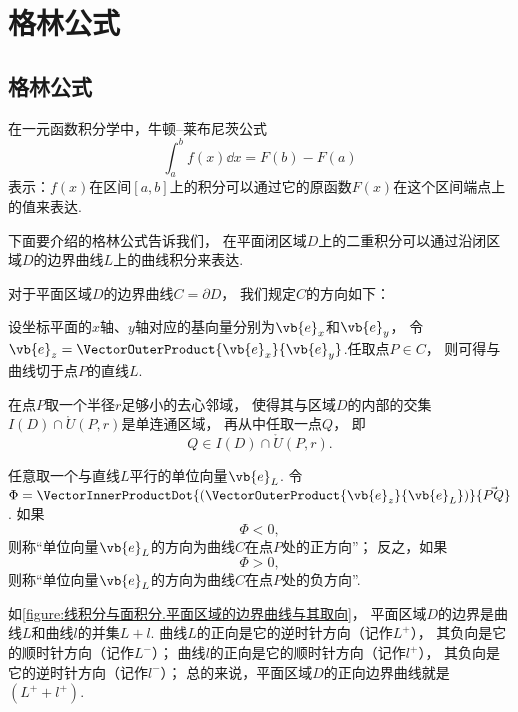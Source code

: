 \section{格林公式}
\subsection{格林公式}
在一元函数积分学中，牛顿--莱布尼茨公式\begin{equation*}
	\int_a^b f(x) \dd{x} = F(b) - F(a)
\end{equation*}表示：\(f(x)\)在区间\([a,b]\)上的积分可以通过它的原函数\(F(x)\)在这个区间端点上的值来表达.

下面要介绍的格林公式告诉我们，
在平面闭区域\(D\)上的二重积分可以通过沿闭区域\(D\)的边界曲线\(L\)上的曲线积分来表达.

\begin{definition}\label{definition:线积分与面积分.平面闭区域的边界曲线的取向}
对于平面区域\(D\)的边界曲线\(C = \partial D\)，
我们规定\(C\)的方向如下：

设坐标平面的\(x\)轴、\(y\)轴对应的基向量分别为\(\vb{e}_x\)和\(\vb{e}_y\)，
令\(\vb{e}_z = \VectorOuterProduct{\vb{e}_x}{\vb{e}_y}\).任取点\(P \in C\)，
则可得与曲线切于点\(P\)的直线\(L\).

在点\(P\)取一个半径\(r\)足够小的去心邻域，
使得其与区域\(D\)的内部的交集\(I(D) \cap \mathring{U}(P,r)\)是单连通区域，
再从中任取一点\(Q\)，
即\begin{equation*}
	Q \in I(D) \cap \mathring{U}(P,r).
\end{equation*}

任意取一个与直线\(L\)平行的单位向量\(\vb{e}_L\).
令\(\Phi = \VectorInnerProductDot{(\VectorOuterProduct{\vb{e}_z}{\vb{e}_L})}{\vec{PQ}}\).
如果\begin{equation*}
	\Phi < 0,
\end{equation*}
则称“单位向量\(\vb{e}_L\)的方向为曲线\(C\)在点\(P\)处的正方向”；
反之，如果\begin{equation*}
	\Phi > 0,
\end{equation*}
则称“单位向量\(\vb{e}_L\)的方向为曲线\(C\)在点\(P\)处的负方向”.
\end{definition}
如\cref{figure:线积分与面积分.平面区域的边界曲线与其取向}，
平面区域\(D\)的边界是曲线\(L\)和曲线\(l\)的并集\(L+l\).
曲线\(L\)的正向是它的逆时针方向（记作\(L^+\)），
其负向是它的顺时针方向（记作\(L^-\)）；
曲线\(l\)的正向是它的顺时针方向（记作\(l^+\)），
其负向是它的逆时针方向（记作\(l^-\)）；
总的来说，平面区域\(D\)的正向边界曲线就是\((L^+ + l^+)\).

